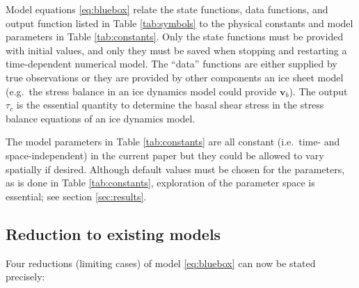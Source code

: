\documentclass[gmd]{copernicus}   %
\newcommand\bv{\mathbf{v}}
\begin{document}
Model equations \eqref{eq:bluebox} relate the state functions, data functions, and output function listed in Table \ref{tab:symbols} to the physical constants and model parameters in Table \ref{tab:constants}.  Only the state functions must be provided with initial values, and only they must be saved when stopping and restarting a time-dependent numerical model.  The ``data'' functions are either supplied by true observations or they are provided by other components an ice sheet model (e.g.~the stress balance in an ice dynamics model could provide $\bv_b$).  The output $\tau_c$ is the essential quantity to determine the basal shear stress in the stress balance equations of an ice dynamics model.

The model parameters in Table \ref{tab:constants} are all constant (i.e.~time- and space-independent) in the current paper but they could be allowed to vary spatially if desired.  Although default values must be chosen for the parameters, as is done in Table \ref{tab:constants}, exploration of the parameter space is essential; see section \ref{sec:results}.

\subsection{Reduction to existing models}  Four reductions (limiting cases) of model \eqref{eq:bluebox} can now be stated precisely:
\end{document}
